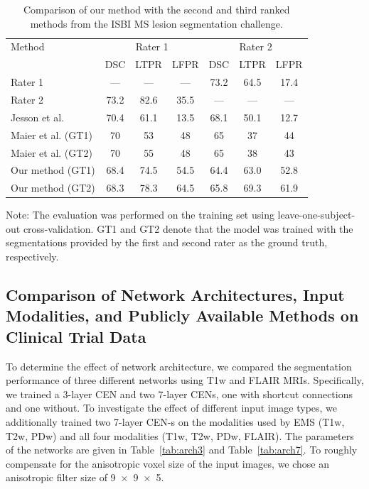 \begin{table}
\caption{Comparison of our method with the second and third ranked methods from
the ISBI MS lesion segmentation challenge.}
\label{tab:isbi}
\begin{center}
\begin{tabular}{@{}lcccccc@{}}
\toprule
Method &
\multicolumn{3}{c}{Rater 1} &
\multicolumn{3}{c}{Rater 2} \\
& DSC & LTPR & LFPR & DSC & LTPR & LFPR \\
\midrule
Rater 1 & --- & --- & --- & 73.2 & 64.5 & 17.4 \\
Rater 2 & 73.2 & 82.6 & 35.5 & --- & --- & --- \\
Jesson et al. \cite{jesson2015} &  70.4 & 61.1 & 13.5 & 68.1 & 50.1 & 12.7 \\
Maier et al. (GT1) & 70 & 53 & 48 & 65 & 37 & 44 \\
Maier et al. (GT2) & 70 & 55 & 48 & 65 & 38 & 43 \\
Our method (GT1) & 68.4 & 74.5 & 54.5 & 64.4 & 63.0 & 52.8 \\
Our method (GT2) & 68.3 & 78.3 & 64.5 & 65.8 & 69.3 & 61.9 \\
\bottomrule
\end{tabular}
\end{center}
Note: The evaluation was performed on the training set using
leave-one-subject-out cross-validation. GT1 and GT2 denote that the model was
trained with the segmentations provided by the first and second rater as the
ground truth, respectively.
\end{table}

\subsection{Comparison of Network Architectures, Input Modalities, and
Publicly Available Methods on Clinical Trial Data}

To determine the effect of network architecture, we compared the segmentation
performance of three different networks using T1w and FLAIR MRIs.
Specifically, we trained a 3-layer CEN and two 7-layer CENs, one with shortcut
connections and one without. To investigate the effect of different input image
types, we additionally trained two 7-layer CEN-s on the modalities used by EMS
(T1w, T2w, PDw) and all four modalities (T1w, T2w, PDw, FLAIR). The parameters
of the networks are given in Table~\ref{tab:arch3} and Table~\ref{tab:arch7}. To
roughly compensate for the anisotropic voxel size of the input images, we chose
an anisotropic filter size of \num{9x9x5}.

